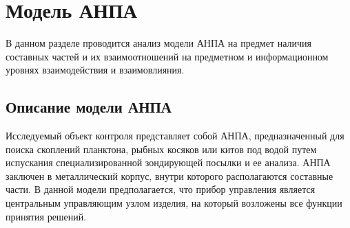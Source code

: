 \chapter{Модель АНПА}\label{sec:part2}
В данном разделе проводится анализ модели АНПА на предмет наличия составных частей
и их взаимоотношений на предметном и информационном уровнях взаимодействия и взаимовлияния.

\section{Описание модели АНПА} \label{sec:model_anpa}

Исследуемый объект контроля представляет собой АНПА, предназначенный для поиска скоплений планктона,
рыбных косяков или китов под водой путем испускания специализированной зондирующей посылки и ее анализа.
АНПА заключен в металлический корпус, внутри которого располагаются составные части.
В данной модели предполагается, что прибор управления является центральным управляющим узлом изделия,
на который возложены все функции принятия решений.

